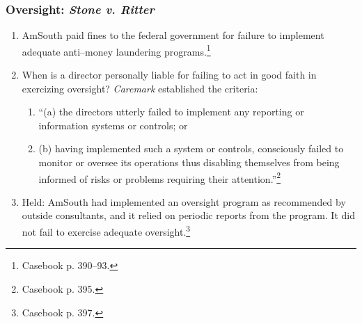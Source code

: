 \subsubsection{Oversight: \emph{Stone v. Ritter}}

\begin{enumerate}
    \item AmSouth paid fines to the federal government for failure to 
    implement adequate anti--money laundering programs.\footnote{Casebook p. 
    390--93.}
    \item When is a director personally liable for failing to act in good 
    faith in exercizing oversight? \emph{Caremark} established the criteria:
    \begin{enumerate}
        \item ``(a) the directors utterly failed to implement any reporting or 
        information systems or controls; or
        \item (b) having implemented such a system or controls, consciously 
        failed to monitor or oversee its operations thus disabling themselves 
        from being informed of risks or problems requiring their 
        attention.''\footnote{Casebook p. 395.}
    \end{enumerate}
    \item Held: AmSouth had implemented an oversight program as recommended by 
    outside consultants, and it relied on periodic reports from the program. 
    It did not fail to exercise adequate oversight.\footnote{Casebook p. 397.}
\end{enumerate}
